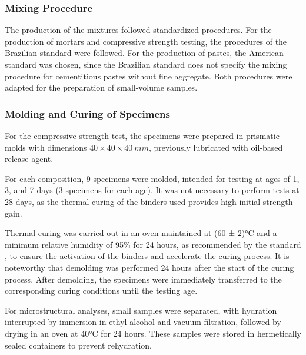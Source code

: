 \subsubsection{Mixing Procedure}
\label{sec:mixing_procedure}

The production of the mixtures followed standardized procedures. For the production of mortars and compressive strength testing, the procedures of the Brazilian standard \cite{ABNT_NBR_7215_2019} were followed. For the production of pastes, the American standard \cite{ASTM_C305_2006} was chosen, since the Brazilian standard does not specify the mixing procedure for cementitious pastes without fine aggregate. Both procedures were adapted for the preparation of small-volume samples.

\subsubsection{Molding and Curing of Specimens}
\label{sec:molding_and_curing_specimens}

For the compressive strength test, the specimens were prepared in prismatic molds with dimensions $40 \times 40 \times 40 \ mm$, previously lubricated with oil-based release agent.

For each composition, 9 specimens were molded, intended for testing at ages of 1, 3, and 7 days (3 specimens for each age). It was not necessary to perform tests at 28 days, as the thermal curing of the binders used provides high initial strength gain.

Thermal curing was carried out in an oven maintained at (60 ± 2)°C and a minimum relative humidity of 95\% for 24 hours, as recommended by the standard \cite{ABNT_NBR_9479_2006}, to ensure the activation of the binders and accelerate the curing process.
It is noteworthy that demolding was performed 24 hours after the start of the curing process. After demolding, the specimens were immediately transferred to the corresponding curing conditions until the testing age.

For microstructural analyses, small samples were separated, with hydration interrupted by immersion in ethyl alcohol and vacuum filtration, followed by drying in an oven at 40°C for 24 hours.
These samples were stored in hermetically sealed containers to prevent rehydration.

